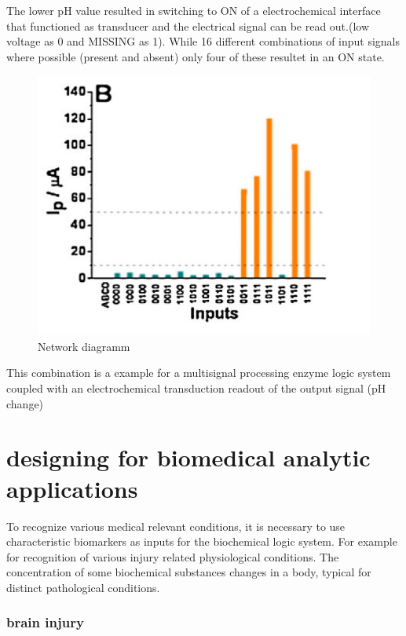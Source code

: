 \documentclass[runningheads]{llncs}
\begin{document}
		The lower pH value resulted in switching to ON of a electrochemical interface that functioned as transducer and the electrical signal can be read out.(low voltage as 0 and MISSING as 1). While 16 different combinations of input signals where possible (present and absent) only four of these resultet in an ON state.
		\begin{figure}[H] \centering \includegraphics[scale= 0.4]{pics/ph.png} \caption{Network diagramm} \label{img:ph} \end{figure}
	
	
		This combination is a example for a multisignal processing enzyme logic system coupled with an electrochemical transduction readout of the output signal (pH change)



\section{designing for biomedical analytic applications}
	To recognize various medical relevant conditions, it is necessary to use characteristic biomarkers as inputs for the biochemical logic system. 
	For example for recognition of various injury related physiological conditions. The concentration of some biochemical substances changes in a body, typical for distinct pathological conditions.
	
	\subsubsection{brain injury}
	
\end{document}
